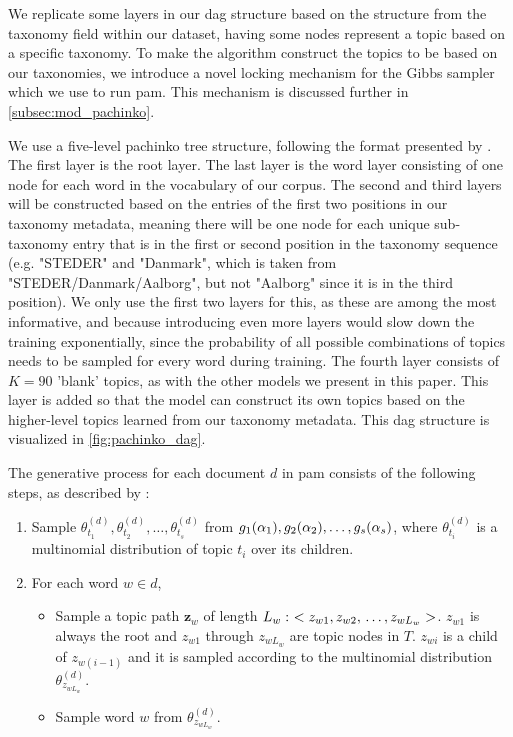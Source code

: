 We replicate some layers in our \gls{dag} structure based on the structure from the taxonomy field within our dataset, having some nodes represent a topic based on a specific taxonomy.
To make the algorithm construct the topics to be based on our taxonomies, we introduce a novel locking mechanism for the Gibbs sampler which we use to run \gls{pam}.
This mechanism is discussed further in \autoref{subsec:mod_pachinko}.

We use a five-level pachinko tree structure, following the format presented by \citet{li2006pachinko}.
The first layer is the root layer.
The last layer is the word layer consisting of one node for each word in the vocabulary of our corpus.
The second and third layers will be constructed based on the entries of the first two positions in our taxonomy metadata, meaning there will be one node for each unique sub-taxonomy entry that is in the first or second position in the taxonomy sequence (e.g. "STEDER" and "Danmark", which is taken from "STEDER/Danmark/Aalborg", but not "Aalborg" since it is in the third position).
We only use the first two layers for this, as these are among the most informative, and because introducing even more layers would slow down the training exponentially, since the probability of all possible combinations of topics needs to be sampled for every word during training. 
The fourth layer consists of $K = 90$ 'blank' topics, as with the other models we present in this paper.
This layer is added so that the model can construct its own topics based on the higher-level topics learned from our taxonomy metadata.
This \gls{dag} structure is visualized in \autoref{fig:pachinko_dag}. 

The generative process for each document $d$ in \gls{pam} consists of the following steps, as described by \citet{li2006pachinko}:
\begin{enumerate}
	\item Sample $\theta_{t_1}^{(d)}, \theta_{t_2}^{(d)}, \dots, \theta_{t_s}^{(d)}$ from $g_1(\alpha_1), g_2(\alpha_2), \dots, \newline g_s(\alpha_s)$, where $\theta_{t_i}^{(d)}$ is a multinomial distribution of topic $t_i$ over its children.
	\item For each word $w \in d$,
	\begin{itemize}
		\item Sample a topic path $\mathbf{z}_w$ of length $L_w:~< z_{w1}, z_{w2},\newline \dots, z_{wL_w} >$. $z_{w1}$ is always the root and $z_{w1}$ through $z_{wL_w}$ are topic nodes in $T$. $z_{wi}$ is a child of $z_{w(i-1)}$ and it is sampled according to the multinomial distribution $\theta_{z_{wL_w}}^{(d)}$.
		\item Sample word $w$ from $\theta_{z_{wL_w}}^{(d)}$.
	\end{itemize}
\end{enumerate}


